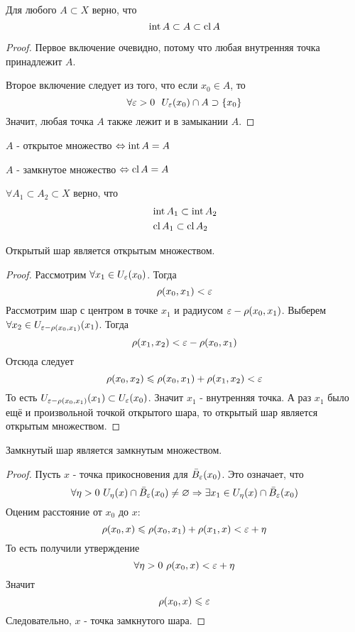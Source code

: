 \begin{lemma}
	Для любого $A \subset X$ верно, что
	\[
		\operatorname{int} A \subset A \subset \operatorname{cl} A
	\]
\end{lemma}

\begin{proof}
	Первое включение очевидно, потому что любая внутренняя точка принадлежит $A$.
	
	Второе включение следует из того, что если $x_0 \in A$, то
	\[
		\forall \varepsilon > 0\ \ U_\varepsilon(x_0) \cap A \supset \{x_0\}
	\]
	Значит, любая точка $A$ также лежит и в замыкании $A$.
\end{proof}

\begin{corollary}
	$A$ - открытое множество $\Leftrightarrow \operatorname{int} A = A$
	
	$A$ - замкнутое множество $\Leftrightarrow \operatorname{cl} A = A$ 
\end{corollary}

\begin{lemma} \label{includeLemma}
	$\forall A_1 \subset A_2 \subset X$ верно, что
	\begin{align*}
		&\operatorname{int} A_1 \subset \operatorname{int} A_2
		\\
		&\operatorname{cl} A_1 \subset \operatorname{cl} A_2
	\end{align*}
\end{lemma}

\begin{lemma}
	Открытый шар является открытым множеством.
\end{lemma}

\begin{proof}
	Рассмотрим $\forall x_1 \in U_\varepsilon(x_0)$. Тогда
	\[
		\rho(x_0, x_1) < \varepsilon
	\]
	Рассмотрим шар с центром в точке $x_1$ и радиусом $\varepsilon - \rho(x_0, x_1)$. Выберем $\forall x_2 \in U_{\varepsilon - \rho(x_0, x_1)}(x_1)$. Тогда
	\[
		\rho(x_1, x_2) < \varepsilon - \rho(x_0, x_1)
	\]
	Отсюда следует
	\[
		\rho(x_0, x_2) \leqslant \rho(x_0, x_1) + \rho(x_1, x_2) < \varepsilon
	\]
	То есть $U_{\varepsilon - \rho(x_0, x_1)}(x_1) \subset U_\varepsilon(x_0)$. Значит $x_1$ - внутренняя точка. А раз $x_1$ было ещё и произвольной точкой открытого шара, то открытый шар является открытым множеством.
\end{proof}

\begin{lemma}
	Замкнутый шар является замкнутым множеством.
\end{lemma}

\begin{proof}
	Пусть $x$ - точка прикосновения для $\bar{B}_\varepsilon(x_0)$. Это означает, что
	\[
		\forall \eta > 0\ U_\eta(x) \cap \bar{B}_\varepsilon(x_0) \neq \varnothing \Rightarrow \exists x_1 \in U_\eta(x) \cap \bar{B}_\varepsilon(x_0)
	\]
	Оценим расстояние от $x_0$ до $x$:
	\[
		\rho(x_0, x) \leqslant \rho(x_0, x_1) + \rho(x_1, x) < \varepsilon + \eta
	\]
	То есть получили утверждение
	\[
		\forall \eta > 0\ \rho(x_0, x) < \varepsilon + \eta
	\]
	Значит
	\[
		\rho(x_0, x) \leqslant \varepsilon
	\]
	Следовательно, $x$ - точка замкнутого шара.
\end{proof}

